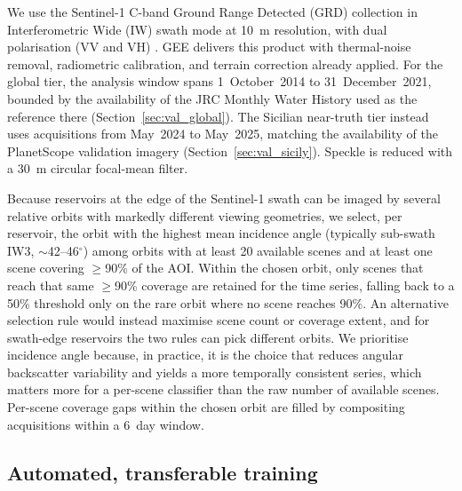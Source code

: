 We use the Sentinel-1 C-band Ground Range Detected (GRD) collection in
Interferometric Wide (IW) swath mode at 10~m resolution, with dual
polarisation (VV and VH) \citep{Torres2012}. GEE delivers this product with
thermal-noise removal, radiometric calibration, and terrain correction
already applied. For the global tier, the analysis window spans 1~October~2014 to
31~December~2021, bounded by the availability of the JRC Monthly Water History
used as the reference there (Section~\ref{sec:val_global}). The Sicilian
near-truth tier instead uses acquisitions from May~2024 to May~2025, matching
the availability of the PlanetScope validation imagery
(Section~\ref{sec:val_sicily}). Speckle is
reduced with a 30~m circular focal-mean filter.

Because reservoirs at the edge of the Sentinel-1 swath can be imaged by
several relative orbits with markedly different viewing geometries, we select,
per reservoir, the orbit with the highest mean incidence angle (typically
sub-swath IW3, $\sim$42--46$^{\circ}$) among orbits with at least 20 available
scenes and at least one scene covering $\geq$90\% of the AOI. Within the
chosen orbit, only scenes that reach that same $\geq$90\% coverage are
retained for the time series, falling back to a 50\% threshold only on the
rare orbit where no scene reaches 90\%. An alternative selection rule would
instead maximise scene count or coverage extent, and for swath-edge
reservoirs the two rules can pick different orbits. We prioritise incidence
angle because, in practice, it is the choice that reduces angular
backscatter variability and yields a more temporally consistent series,
which matters more for a per-scene classifier than the raw number of
available scenes. Per-scene coverage gaps within the chosen orbit are filled
by compositing acquisitions within a 6~day window.

\subsection{Automated, transferable training}
\label{sec:methods_training}

